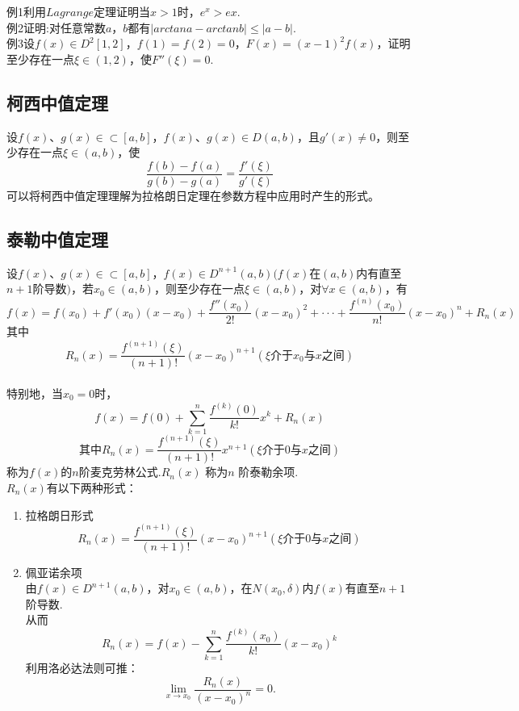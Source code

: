 \documentclass[UTF8]{ctexart}
\begin{document}
例1\quad 利用$Lagrange$定理证明当$x>1$时，$e^x>ex$.
\\例2\quad 证明:对任意常数$a$，$b$都有$|arctana-arctanb|\leq |a-b|$.
\\例3\quad 设$f(x)\in D^2[1,2]$，$f(1)=f(2)=0$，$F(x)=(x-1)^2f(x)$，证明至少存在一点$\xi\in(1,2)$，使$F''(\xi)=0$.
\begin{CJK}{UTF8}{fs}
\vspace{-4mm} \subsection{柯西中值定理} \vspace{-2mm} 设$f(x)$、$g(x)\in\subset[a,b]$，$f(x)$、$g(x)\in D(a,b)$，且$g'(x)\neq0$，则至少存在一点$\xi\in(a,b)$，使
$$\frac{f(b)-f(a)}{g(b)-g(a)}=\frac{f'(\xi)}{g'(\xi)}$$
可以将柯西中值定理理解为拉格朗日定理在参数方程中应用时产生的形式。
\vspace{-4mm} \subsection{泰勒中值定理} \vspace{-2mm} 设$f(x)$、$g(x)\in\subset[a,b]$，$f(x)\in D^{n+1}(a,b)(f(x)$在$(a,b)$内有直至$n+1$阶导数$)$，若$x_0\in(a,b)$，则至少存在一点$\xi\in(a,b)$，对$\forall x\in(a,b)$，有
$$f(x)=f(x_0)+f'(x_0)(x-x_0)+\frac{f''(x_0)}{2!}(x-x_0)^2+\cdot \cdot \cdot+\frac{f^{(n)}(x_0)}{n!}(x-x_0)^n+R_n (x) $$
其中$$R_n(x)=\frac{f^{(n+1)}(\xi)}{(n+1)!}(x-x_0)^{n+1}(\xi\mbox{介于}x_0\mbox{与}x\mbox{之间})$$
\\特别地，当$x_0 =0$时，$$f(x)=f(0)+\sum_{k=1}^n \frac{f^{(k)}(0)}{k!}x^k+R_n (x)$$
$$\mbox{其中}R_n (x)=\frac{f^{(n+1)}(\xi)}{(n+1)!}x^{n+1}(\xi\mbox{介于}0\mbox{与}x\mbox{之间})$$称为$f(x)$的$n$阶麦克劳林公式.$R_n (x)$ 称为$n$ 阶泰勒余项.
\\$R_n (x)$有以下两种形式：
\vspace{-4mm}
\\\begin{enumerate}[(1)]
\item 拉格朗日形式$$R_n (x)=\frac{f^{(n+1)}(\xi)}{(n+1)!}(x-x_0)^{n+1}(\xi\mbox{介于}0\mbox{与}x\mbox{之间})$$
\item 佩亚诺余项
\\由$f(x)\in D^{n+1}(a,b)$，对$x_0\in(a,b)$，在$N(x_0,\delta)$内$f(x)$有直至$n+1$阶导数.
\\从而$$R_n(x)=f(x)-\sum_{k=1}^n \frac{f^{(k)}(x_0)}{k!}(x-x_0)^k$$
利用洛必达法则可推：$$\lim_{x \to x_0} \frac{R_n (x)}{(x-x_0)^n} = 0.$$

\end{enumerate}
\end{CJK}
\end{document}
